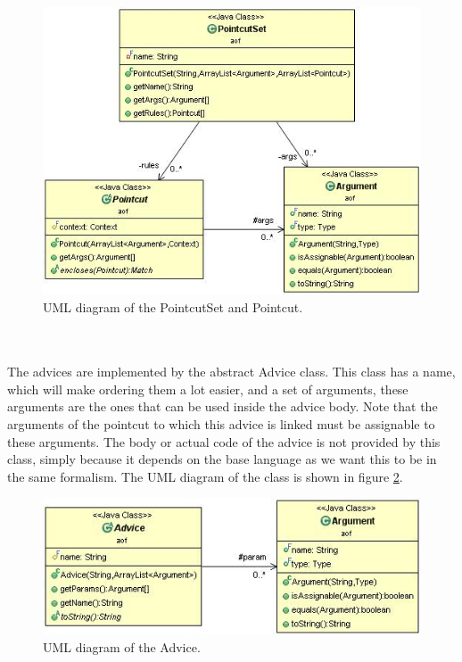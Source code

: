 \documentclass[a4paper]{report}
\begin{document}
\begin{figure}[h!]
\centering
\includegraphics[scale=0.7]{images/AOF/PointcutSet.jpg}
\caption{UML diagram of the PointcutSet and Pointcut.}
\label{fig:PointcutSet}
\end{figure}\\
\\
The advices are implemented by the abstract Advice class. This class has a name, which will make ordering them a lot easier, and a set of arguments, these arguments are the ones that can be used inside the advice body. Note that the arguments of the pointcut to which this advice is linked must be assignable to these arguments. The body or actual code of the advice is not provided by this class, simply because it depends on the base language as we want this to be in the same formalism. The UML diagram of the class is shown in figure \ref{fig:Advice}.
\begin{figure}[h!]
\centering
\includegraphics[scale=0.7]{images/AOF/Advice.jpg}
\caption{UML diagram of the Advice.}
\label{fig:Advice}
\end{figure}\\
\\
\end{document}
